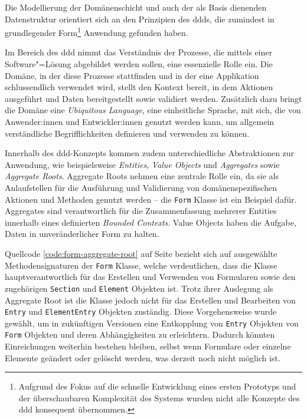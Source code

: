 \documentclass[a4paper,12pt,twoside,numbers=noendperiod]{scrreprt}
\begin{document}
Die Modellierung der Domänenschicht und auch der als Basis dienenden Datenstruktur orientiert sich an den Prinzipien des \acp{ddd}, die zumindest in grundlegender Form\footnote{Aufgrund des Fokus auf die schnelle Entwicklung eines ersten Prototyps und der überschaubaren Komplexität des Systems wurden nicht alle Konzepte des \ac{ddd} konsequent übernommen.} Anwendung gefunden haben.

Im Bereich des \ac{ddd} nimmt das Verständnis der Prozesse, die mittels einer Software"=Lösung abgebildet werden sollen, eine essenzielle Rolle ein. Die Domäne, in der diese Prozesse stattfinden und in der eine Applikation schlussendlich verwendet wird, stellt den Kontext bereit, in dem Aktionen ausgeführt und Daten bereitgestellt sowie validiert werden. Zusätzlich dazu bringt die Domäne eine \textit{Ubiquitous Language}, eine einheitliche Sprache, mit sich, die von Anwender:innen und Entwickler:innen genutzt werden kann, um allgemein verständliche Begrifflichkeiten definieren und verwenden zu können. \cite{airbrake_technologies_inc_domain-driven_2022, fowler_domaindrivendesign_2020}

Innerhalb des \ac{ddd}-Konzepts kommen zudem unterschiedliche Abstraktionen zur Anwendung, wie beispielsweise \textit{Entities}, \textit{Value Objects} und \textit{Aggregates} sowie \textit{Aggregate Roots}. Aggregate Roots nehmen eine zentrale Rolle ein, da sie als Anlaufstellen für die Ausführung und Validierung von domänenspezifischen Aktionen und Methoden genutzt werden -- die \texttt{Form} Klasse ist ein Beispiel dafür. Aggregates sind verantwortlich für die Zusammenfassung mehrerer Entities innerhalb eines definierten \textit{Bounded Contexts}. Value Objects haben die Aufgabe, Daten in unveränderlicher Form zu halten. \cite{airbrake_technologies_inc_domain-driven_2022, fowler_domaindrivendesign_2020, fowler_ddd_aggregate_2013}

\medskip

Quellcode \ref{code:form-aggregate-root} auf Seite \pageref{code:form-aggregate-root} bezieht sich auf ausgewählte Methodensignaturen der \texttt{Form} Klasse, welche verdeutlichen, dass die Klasse hauptverantwortlich für das Erstellen und Verwenden von Formularen sowie den zugehörigen \texttt{Section} und \texttt{Element} Objekten ist. Trotz ihrer Auslegung als Aggregate Root ist die Klasse jedoch nicht für das Erstellen und Bearbeiten von \texttt{Entry} und \texttt{ElementEntry} Objekten zuständig. Diese Vorgehensweise wurde gewählt, um in zukünftigen Versionen eine Entkopplung von \texttt{Entry} Objekten von \texttt{Form} Objekten und deren Abhängigkeiten zu erleichtern. Dadurch könnten Einreichungen weiterhin bestehen bleiben, selbst wenn Formulare oder einzelne Elemente geändert oder gelöscht werden, was derzeit noch nicht möglich ist.
\end{document}
